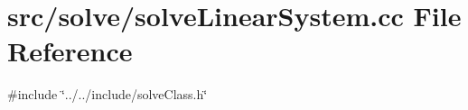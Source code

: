 \section{src/solve/solve\+Linear\+System.cc File Reference}
\label{solve_linear_system_8cc}
{\ttfamily \#include \char`\"{}../../include/solve\+Class.\+h\char`\"{}}\newline
